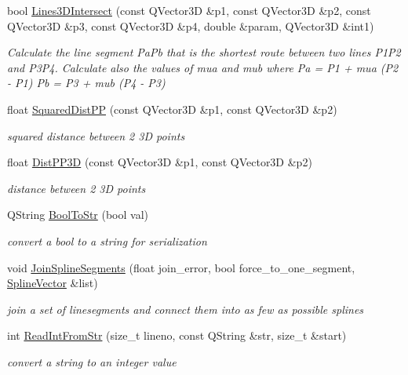 \begin{DoxyCompactItemize}
bool \hyperlink{namespaceShipCAD_aec056383a39d900bd079feee8bcca060}{Lines3\+D\+Intersect} (const Q\+Vector3D \&p1, const Q\+Vector3D \&p2, const Q\+Vector3D \&p3, const Q\+Vector3D \&p4, double \&param, Q\+Vector3D \&int1)
\begin{DoxyCompactList}\small\item\em Calculate the line segment Pa\+Pb that is the shortest route between two lines P1\+P2 and P3\+P4. Calculate also the values of mua and mub where Pa = P1 + mua (P2 -\/ P1) Pb = P3 + mub (P4 -\/ P3) \end{DoxyCompactList}\item 
float \hyperlink{namespaceShipCAD_a6f9f5ac15e7e2821bba27ba06827a4e1}{Squared\+Dist\+PP} (const Q\+Vector3D \&p1, const Q\+Vector3D \&p2)
\begin{DoxyCompactList}\small\item\em squared distance between 2 3D points \end{DoxyCompactList}\item 
float \hyperlink{namespaceShipCAD_a438e97b711c6878eba3bf7182e68a3c7}{Dist\+P\+P3D} (const Q\+Vector3D \&p1, const Q\+Vector3D \&p2)
\begin{DoxyCompactList}\small\item\em distance between 2 3D points \end{DoxyCompactList}\item 
Q\+String \hyperlink{namespaceShipCAD_a45ba7de6922e89cbddf2a4c9c810a2e4}{Bool\+To\+Str} (bool val)
\begin{DoxyCompactList}\small\item\em convert a bool to a string for serialization \end{DoxyCompactList}\item 
void \hyperlink{namespaceShipCAD_a2eddf75f0e29363ab81a3fb0e0211848}{Join\+Spline\+Segments} (float join\+\_\+error, bool force\+\_\+to\+\_\+one\+\_\+segment, \hyperlink{namespaceShipCAD_a053b941b2c87049bb9380428d4d5a056}{Spline\+Vector} \&list)
\begin{DoxyCompactList}\small\item\em join a set of linesegments and connect them into as few as possible splines \end{DoxyCompactList}\item 
int \hyperlink{namespaceShipCAD_a70b238d926183460670b82d9680b5cb9}{Read\+Int\+From\+Str} (size\+\_\+t lineno, const Q\+String \&str, size\+\_\+t \&start)
\begin{DoxyCompactList}\small\item\em convert a string to an integer value \end{DoxyCompactList}\item 

\end{DoxyCompactItemize}
